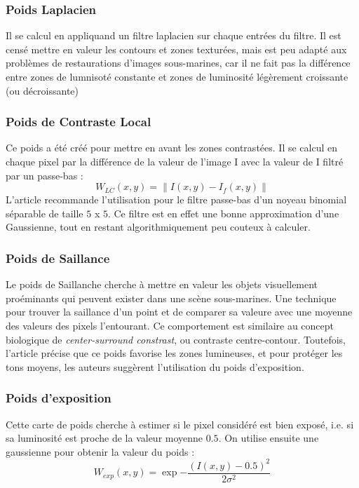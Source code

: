 \documentclass[twoside]{article}
\begin{document}
\begin{multicols}{2}
\subsubsection{Poids Laplacien}
Il se calcul en appliquand un filtre laplacien sur chaque entrées du filtre. Il est censé mettre en valeur les contours et zones texturées, mais est peu adapté aux problèmes de restaurations d'images sous-marines, car il ne fait pas la différence entre zones de lumnisoté constante et zones de luminosité légèrement croissante (ou décroissante)

\subsubsection{Poids de Contraste Local}
Ce poids a été créé pour mettre en avant les zones contrastées. Il se calcul en chaque pixel par la différence de la valeur de l'image I avec la valeur de I filtré par un passe-bas : $$ W_{LC}(x,y) = \|I(x,y) - I_{f}(x,y)\| $$
L'article recommande l'utilisation pour le filtre passe-bas d'un noyeau binomial séparable de taille $5$ x $5$. Ce filtre est en effet une bonne approximation d'une Gaussienne, tout en restant algorithmiquement peu couteux à calculer.

\subsubsection{Poids de Saillance}
Le poids de Saillanche cherche à mettre en valeur les objets visuellement proéminants qui peuvent exister dans une scène sous-marines. Une technique pour trouver la saillance d'un point et de comparer sa valeure avec une moyenne des valeurs des pixels l'entourant. Ce comportement est similaire au concept biologique de \emph{center-surround constrast}, ou contraste centre-contour. Toutefois, l'article précise que ce poids favorise les zones lumineuses, et pour protéger les tons moyens, les auteurs suggèrent l'utilisation du poids d'exposition.

\subsubsection{Poids d'exposition}
Cette carte de poids cherche à estimer si le pixel considéré est bien exposé, i.e. si sa luminosité est proche de la valeur moyenne $0.5$. On utilise ensuite une gaussienne pour obtenir la valeur du poids : $$W_{exp}(x,y) = \exp{-\frac{(I(x,y) - 0.5)^2}{2\sigma^2}}$$


\end{multicols}
\end{document}
